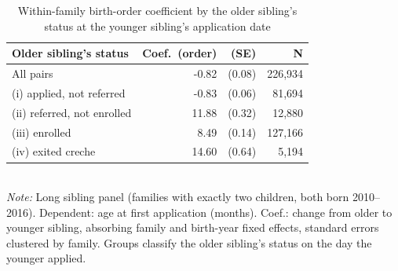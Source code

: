 \begin{table}[htbp]\centering
\caption{Within-family birth-order coefficient by the older sibling's status at the younger sibling's application date}
\label{tab:C3}
\footnotesize
\setlength{\tabcolsep}{4pt}
\begin{tabular}{lrrr}
\toprule
Older sibling's status & Coef.\ (order) & (SE) & N \\
\midrule
All pairs & -0.82 & (0.08) & 226,934 \\
(i) applied, not referred & -0.83 & (0.06) & 81,694 \\
(ii) referred, not enrolled & 11.88 & (0.32) & 12,880 \\
(iii) enrolled & 8.49 & (0.14) & 127,166 \\
(iv) exited creche & 14.60 & (0.64) & 5,194 \\
\bottomrule
\end{tabular}
\\[3pt]{\footnotesize \textit{Note:} Long sibling panel (families with exactly two children, both born 2010--2016). Dependent: age at first application (months). Coef.: change from older to younger sibling, absorbing family and birth-year fixed effects, standard errors clustered by family. Groups classify the older sibling's status on the day the younger applied.}
\end{table}
